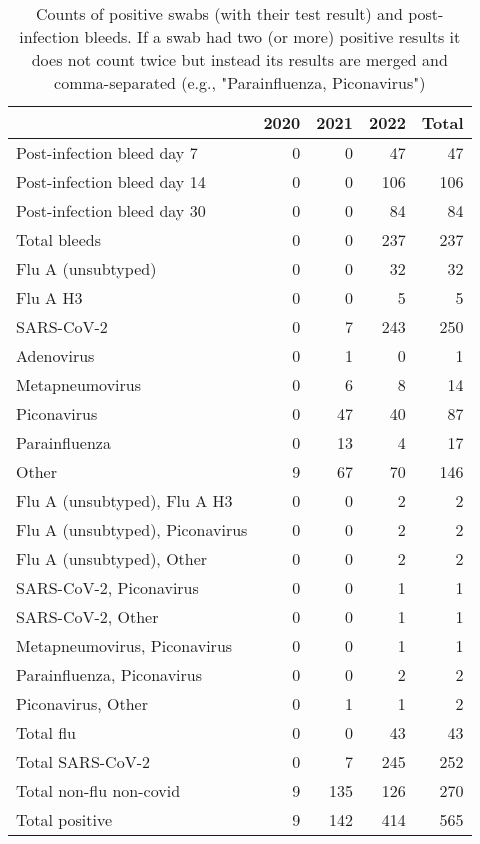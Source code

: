 \begin{table}

\caption{\label{tab:infection-counts}Counts of positive swabs (with their test result) and post-infection bleeds.
        If a swab had two (or more) positive results it does not count twice but instead its
        results are merged and comma-separated (e.g., "Parainfluenza, Piconavirus")}
\centering
\begin{tabular}[t]{lrrrr}
\toprule
  & 2020 & 2021 & 2022 & Total\\
\midrule
Post-infection bleed day 7 & 0 & 0 & 47 & 47\\
Post-infection bleed day 14 & 0 & 0 & 106 & 106\\
Post-infection bleed day 30 & 0 & 0 & 84 & 84\\
\addlinespace
Total bleeds & 0 & 0 & 237 & 237\\
\addlinespace
Flu A (unsubtyped) & 0 & 0 & 32 & 32\\
Flu A H3 & 0 & 0 & 5 & 5\\
\addlinespace
SARS-CoV-2 & 0 & 7 & 243 & 250\\
\addlinespace
Adenovirus & 0 & 1 & 0 & 1\\
Metapneumovirus & 0 & 6 & 8 & 14\\
Piconavirus & 0 & 47 & 40 & 87\\
Parainfluenza & 0 & 13 & 4 & 17\\
Other & 9 & 67 & 70 & 146\\
\addlinespace
Flu A (unsubtyped), Flu A H3 & 0 & 0 & 2 & 2\\
Flu A (unsubtyped), Piconavirus & 0 & 0 & 2 & 2\\
Flu A (unsubtyped), Other & 0 & 0 & 2 & 2\\
\addlinespace
SARS-CoV-2, Piconavirus & 0 & 0 & 1 & 1\\
SARS-CoV-2, Other & 0 & 0 & 1 & 1\\
\addlinespace
Metapneumovirus, Piconavirus & 0 & 0 & 1 & 1\\
Parainfluenza, Piconavirus & 0 & 0 & 2 & 2\\
Piconavirus, Other & 0 & 1 & 1 & 2\\
\addlinespace
Total flu & 0 & 0 & 43 & 43\\
Total SARS-CoV-2 & 0 & 7 & 245 & 252\\
Total non-flu non-covid & 9 & 135 & 126 & 270\\
\addlinespace
Total positive & 9 & 142 & 414 & 565\\
\bottomrule
\end{tabular}
\end{table}
